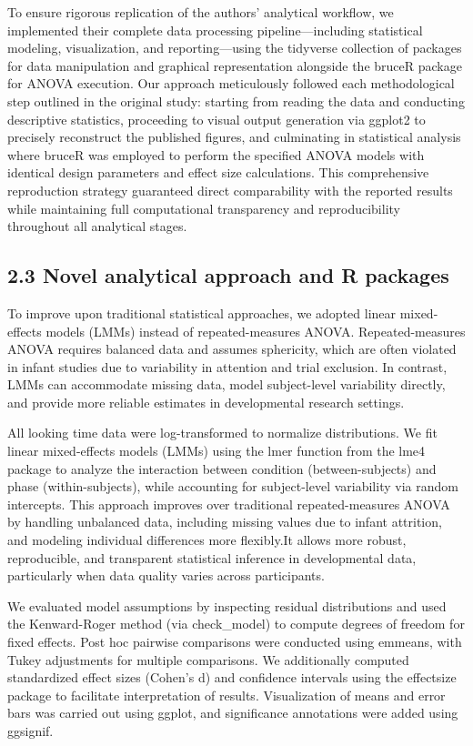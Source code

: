\documentclass[
  man]{apa6}
\begin{document}
To ensure rigorous replication of the authors' analytical workflow, we implemented their complete data processing pipeline---including statistical modeling, visualization, and reporting---using the tidyverse collection of packages for data manipulation and graphical representation alongside the bruceR package for ANOVA execution. Our approach meticulously followed each methodological step outlined in the original study: starting from reading the data and conducting descriptive statistics, proceeding to visual output generation via ggplot2 to precisely reconstruct the published figures, and culminating in statistical analysis where bruceR was employed to perform the specified ANOVA models with identical design parameters and effect size calculations. This comprehensive reproduction strategy guaranteed direct comparability with the reported results while maintaining full computational transparency and reproducibility throughout all analytical stages.

\subsection{2.3 Novel analytical approach and R packages}\label{novel-analytical-approach-and-r-packages}

To improve upon traditional statistical approaches, we adopted linear mixed-effects models (LMMs) instead of repeated-measures ANOVA. Repeated-measures ANOVA requires balanced data and assumes sphericity, which are often violated in infant studies due to variability in attention and trial exclusion. In contrast, LMMs can accommodate missing data, model subject-level variability directly, and provide more reliable estimates in developmental research settings.

All looking time data were log-transformed to normalize distributions. We fit linear mixed-effects models (LMMs) using the lmer function from the lme4 package to analyze the interaction between condition (between-subjects) and phase (within-subjects), while accounting for subject-level variability via random intercepts. This approach improves over traditional repeated-measures ANOVA by handling unbalanced data, including missing values due to infant attrition, and modeling individual differences more flexibly.It allows more robust, reproducible, and transparent statistical inference in developmental data, particularly when data quality varies across participants.

We evaluated model assumptions by inspecting residual distributions and used the Kenward-Roger method (via check\_model) to compute degrees of freedom for fixed effects. Post hoc pairwise comparisons were conducted using emmeans, with Tukey adjustments for multiple comparisons. We additionally computed standardized effect sizes (Cohen's d) and confidence intervals using the effectsize package to facilitate interpretation of results. Visualization of means and error bars was carried out using ggplot, and significance annotations were added using ggsignif.
\end{document}
